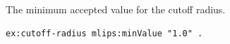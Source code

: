 The minimum accepted value for the cutoff radius.
\begin{lstlisting}[language=turtle]
ex:cutoff-radius mlips:minValue "1.0" .
\end{lstlisting}
